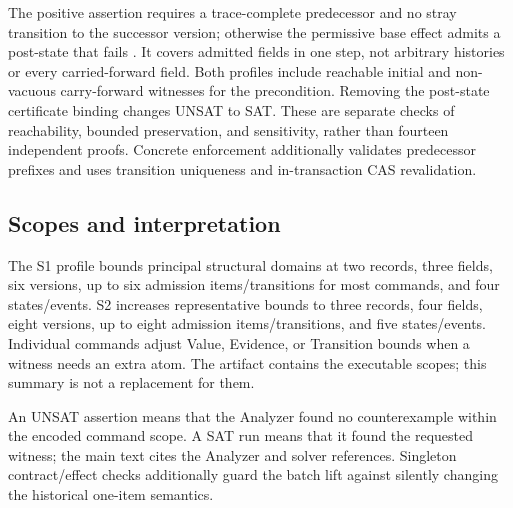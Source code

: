 The positive assertion requires a trace-complete predecessor and no stray transition to the successor version; otherwise the permissive base effect admits a post-state that fails . It covers admitted fields in one step, not arbitrary histories or every carried-forward field. Both profiles include reachable initial and non-vacuous carry-forward witnesses for the precondition. Removing the post-state certificate binding changes UNSAT to SAT. These are separate checks of reachability, bounded preservation, and sensitivity, rather than fourteen independent proofs. Concrete enforcement additionally validates predecessor prefixes and uses transition uniqueness and in-transaction CAS revalidation.

\subsection{Scopes and interpretation}

The S1 profile bounds principal structural domains at two records, three fields, six versions, up to six admission items/transitions for most commands, and four states/events. S2 increases representative bounds to three records, four fields, eight versions, up to eight admission items/transitions, and five states/events. Individual commands adjust Value, Evidence, or Transition bounds when a witness needs an extra atom. The artifact contains the executable scopes; this summary is not a replacement for them.



An UNSAT assertion means that the Analyzer found no counterexample within the encoded command scope. A SAT run means that it found the requested witness; the main text cites the Analyzer and solver references. Singleton contract/effect checks additionally guard the batch lift against silently changing the historical one-item semantics.
